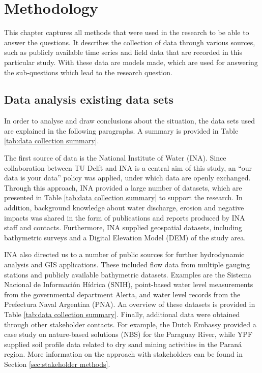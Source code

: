 \chapter{Methodology}
\label{chap:methodology}

This chapter captures all methods that were used in the research to be able to answer the questions. It describes the collection of data through various sources, such as publicly available time series and field data that are recorded in this particular study. With these data are models made, which are used for answering the sub-questions which lead to the research question. 

\section{Data analysis existing data sets}
\label{sec:desk study}
In order to analyse and draw conclusions about the situation, the data sets used are explained in the following paragraphs. A summary is provided in Table \ref{tab:data collection summary}.

The first source of data is the National Institute of Water (INA). Since collaboration between TU Delft and INA is a central aim of this study, an “our data is your data” policy was applied, under which data are openly exchanged. Through this approach, INA provided a large number of datasets, which are presented in Table \ref{tab:data collection summary} to support the research. In addition, background knowledge about water discharge, erosion and negative impacts was shared in the form of publications and reports produced by INA staff and contacts. Furthermore, INA supplied geospatial datasets, including bathymetric surveys and a Digital Elevation Model (DEM) of the study area.

INA also directed us to a number of public sources for further hydrodynamic analysis and GIS applications. These included flow data from multiple gauging stations and publicly available bathymetric datasets. Examples are the Sistema Nacional de Información Hídrica (SNIH), point-based water level measurements from the governmental department Alerta, and water level records from the Prefectura Naval Argentina (PNA). An overview of these datasets is provided in Table \ref{tab:data collection summary}.
Finally, additional data were obtained through other stakeholder contacts. For example, the Dutch Embassy provided a case study on nature-based solutions (NBS) for the Paraguay River, while YPF supplied soil profile data related to dry sand mining activities in the Paraná region. More information on the approach with stakeholders can be found in Section \ref{sec:stakeholder methods}.

